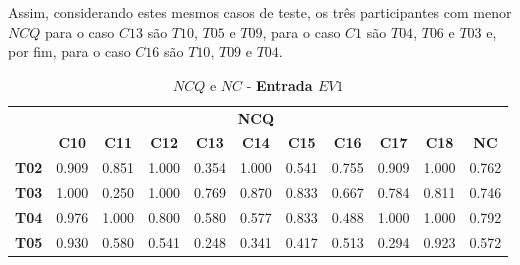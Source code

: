 Assim, considerando estes mesmos casos de teste, os três participantes com menor $NCQ$ para o caso $C13$ são $T10$, $T05$ e $T09$, para o caso $C1$ são $T04$, $T06$ e $T03$ e, por fim, para o caso $C16$ são $T10$, $T09$ e $T04$.


\begin{table}[htbp]
	\centering
	\caption{$NCQ$ e $NC$ - \textbf{Entrada $EV1$}}
	\begin{tabular}{|c|ccccccccc|c|}
		\hline
		\rowcolor[HTML]{D0CECE} 
		\cellcolor[HTML]{D0CECE} & \multicolumn{9}{c|}{\cellcolor[HTML]{D0CECE}\textbf{NCQ}} & \cellcolor[HTML]{D0CECE} \\ \cline{2-10}
		\rowcolor[HTML]{D0CECE} 
		\multirow{-2}{*}{\cellcolor[HTML]{D0CECE}\textbf{Part.}} & \multicolumn{1}{c|}{\cellcolor[HTML]{D0CECE}\textbf{C10}} & \multicolumn{1}{c|}{\cellcolor[HTML]{D0CECE}\textbf{C11}} & \multicolumn{1}{c|}{\cellcolor[HTML]{D0CECE}\textbf{C12}} & \multicolumn{1}{c|}{\cellcolor[HTML]{D0CECE}\textbf{C13}} & \multicolumn{1}{c|}{\cellcolor[HTML]{D0CECE}\textbf{C14}} & \multicolumn{1}{c|}{\cellcolor[HTML]{D0CECE}\textbf{C15}} & \multicolumn{1}{c|}{\cellcolor[HTML]{D0CECE}\textbf{C16}} & \multicolumn{1}{c|}{\cellcolor[HTML]{D0CECE}\textbf{C17}} & \textbf{C18} & \multirow{-2}{*}{\cellcolor[HTML]{D0CECE}\textbf{NC}} \\ \hline
		\textbf{T02} & \multicolumn{1}{c|}{0.909} & \multicolumn{1}{c|}{0.851} & \multicolumn{1}{c|}{1.000} & \multicolumn{1}{c|}{0.354} & \multicolumn{1}{c|}{1.000} & \multicolumn{1}{c|}{0.541} & \multicolumn{1}{c|}{0.755} & \multicolumn{1}{c|}{0.909} & 1.000 & 0.762 \\ \hline
		\rowcolor[HTML]{F2F2F2} 
		\textbf{T03} & \multicolumn{1}{c|}{\cellcolor[HTML]{F2F2F2}1.000} & \multicolumn{1}{c|}{\cellcolor[HTML]{F2F2F2}0.250} & \multicolumn{1}{c|}{\cellcolor[HTML]{F2F2F2}1.000} & \multicolumn{1}{c|}{\cellcolor[HTML]{F2F2F2}0.769} & \multicolumn{1}{c|}{\cellcolor[HTML]{F2F2F2}0.870} & \multicolumn{1}{c|}{\cellcolor[HTML]{F2F2F2}0.833} & \multicolumn{1}{c|}{\cellcolor[HTML]{F2F2F2}0.667} & \multicolumn{1}{c|}{\cellcolor[HTML]{F2F2F2}0.784} & 0.811 & 0.746 \\ \hline
		\textbf{T04} & \multicolumn{1}{c|}{0.976} & \multicolumn{1}{c|}{1.000} & \multicolumn{1}{c|}{0.800} & \multicolumn{1}{c|}{0.580} & \multicolumn{1}{c|}{0.577} & \multicolumn{1}{c|}{0.833} & \multicolumn{1}{c|}{0.488} & \multicolumn{1}{c|}{1.000} & 1.000 & 0.792 \\ \hline
		\rowcolor[HTML]{F2F2F2} 
		\textbf{T05} & \multicolumn{1}{c|}{\cellcolor[HTML]{F2F2F2}0.930} & \multicolumn{1}{c|}{\cellcolor[HTML]{F2F2F2}0.580} & \multicolumn{1}{c|}{\cellcolor[HTML]{F2F2F2}0.541} & \multicolumn{1}{c|}{\cellcolor[HTML]{F2F2F2}0.248} & \multicolumn{1}{c|}{\cellcolor[HTML]{F2F2F2}0.341} & \multicolumn{1}{c|}{\cellcolor[HTML]{F2F2F2}0.417} & \multicolumn{1}{c|}{\cellcolor[HTML]{F2F2F2}0.513} & \multicolumn{1}{c|}{\cellcolor[HTML]{F2F2F2}0.294} & 0.923 & 0.572 \\ \hline

\end{tabular}
\end{table}
